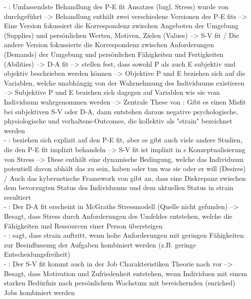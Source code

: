 - \cite[S. 2]{edwards:1990}: Umfassendste Behandlung des P-E fit Ansatzes (bzgl. Stress) wurde von \textcite{mechanismsOfJobStressAndStrain:1982} durchgeführt --> Behandlung enthält zwei verschiedene Versionen des P-E fits --> Eine Version fokussiert die Korrespondenz zwischen Angeboten der Umgebung (Supplies) und persönlichen Werten, Motiven, Zielen (Values) --> S-V fit / Die andere Version fokussierte die Korrespondenz zwischen Anforderungen (Demands) der Umgebung und persönlichen Fähigkeiten und Fertigkeiten (Abilities) --> D-A fit --> \textcite{mechanismsOfJobStressAndStrain:1982} stellen fest, dass sowohl P als auch E subjektiv und objektiv beschrieben werden können --> Objektive P und E beziehen sich auf die Variablen, welche unabhängig von der Wahrnehmung des Individuums existieren --> Subjektive P und E beziehen sich dagegen auf Variablen wie sie vom Individuum wahrgenommen werden --> Zentrale These von \textcite{mechanismsOfJobStressAndStrain:1982}: Gibt es einen Misfit bei subjektiven S-V oder D-A, dann entstehen daraus negative psychologische, physiologische und verhaltens-Outcomes, die kollektiv als "strain" bezeichnet werden \\
- \cite[S. 2]{edwards:1990}: \textcite{mechanismsOfJobStressAndStrain:1982} beziehen sich explizit auf den P-E fit, aber es gibt auch viele andere Studien, die den P-E fit implizit behandeln --> S-V fit ist implizit in \textcite{schuler:1980}s Konzeptualisierung von Stress --> Diese enthält eine dynamische Bedingung, welche das Individuum potentiell davon abhält das zu sein, haben oder tun was sie oder er will (Desires) / Auch das kybernetische Framework von \textcite{cummings:1979} gibt an, dass eine Diskrepanz zwischen dem bevorzugten Status des Individuums und dem aktuellen Status in strain resultiert \\
- \cite[S. 2f.]{edwards:1990}: Der D-A fit erscheint in McGraths Stressmodell (Quelle nicht gefunden) --> Besagt, dass Stress durch Anforderungen des Umfeldes entstehen, welche die Fähigkeiten und Ressourcen einer Person übersteigen \\
- \cite[S. 3]{edwards:1990}: \textcite{karasek:1979} sagt, dass strain auftritt, wenn hohe Anforderungen mit geringen Fähigkeiten zur Beeinflussung der Aufgaben kombiniert werden (z.B. geringe Entscheidungsfreiheit) \\
- \cite[S. 3]{edwards:1990}: Der S-V fit kommt auch in der Job Charakteristiken Theorie nach \textcite{hackmanOldham:1987} vor --> Besagt, dass Motivation und Zufriedenheit entstehen, wenn Individuen mit einem starken Bedürfnis nach persönlichem Wachstum mit bereichernden (enriched) Jobs kombiniert werden \\
